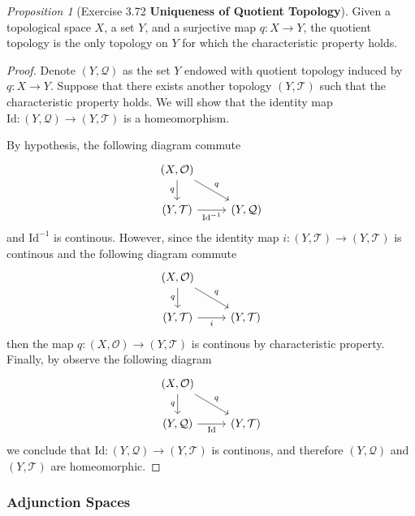 \documentclass[a4paper]{article}
\theoremstyle{remark}
\newtheorem{prop}{Proposition}
\newcommand{\Id}{\text{Id}} %
\begin{document}
\begin{prop}[Exercise 3.72 \cite{LeeTM} \textbf{Uniqueness of Quotient Topology}]
	Given a topological space $X$, a set $Y$, and a surjective map $q : X \to Y$, the quotient topology is the only topology on $Y$ for which the characteristic property holds.
\end{prop}
\begin{proof}
	Denote $(Y,\mathcal{Q})$ as the set $Y$ endowed with quotient topology induced by $q : X \to Y$. Suppose that there exists another topology $(Y,\mathcal{T})$ such that the characteristic property holds. We will show that the identity map $\Id : (Y,\mathcal{Q}) \to (Y,\mathcal{T})$ is a homeomorphism. 
	
	By hypothesis, the following diagram commute
	\[
	\begin{tikzcd}
	(X,\mathcal{O}) \arrow[d,"q",swap] \arrow[dr,"q"] &  \\
	(Y,\mathcal{T}) \arrow[r,"\Id^{-1}",swap] & (Y,\mathcal{Q})
	\end{tikzcd}
	\]
	and $\Id^{-1}$ is continous. However, since the identity map $i : (Y,\mathcal{T}) \to (Y,\mathcal{T})$ is continous and the following diagram commute
	\[
	\begin{tikzcd}
	(X,\mathcal{O}) \arrow[d,"q",swap] \arrow[dr,"q"] &  \\
	(Y,\mathcal{T}) \arrow[r,"i",swap] & (Y,\mathcal{T})
	\end{tikzcd}
	\] 
	then the map $q : (X,\mathcal{O}) \to (Y,\mathcal{T})$ is continous by characteristic property. Finally, by observe the following diagram
	\[
	\begin{tikzcd}
	(X,\mathcal{O}) \arrow[d,"q",swap] \arrow[dr,"q"] &  \\
	(Y,\mathcal{Q}) \arrow[r,"\Id",swap] & (Y,\mathcal{T})
	\end{tikzcd}
	\]
	we conclude that $\Id : (Y,\mathcal{Q}) \to (Y,\mathcal{T})$ is continous, and therefore $(Y,\mathcal{Q})$ and $(Y,\mathcal{T})$ are homeomorphic.  
\end{proof}

\subsubsection*{Adjunction Spaces}
\end{document}
